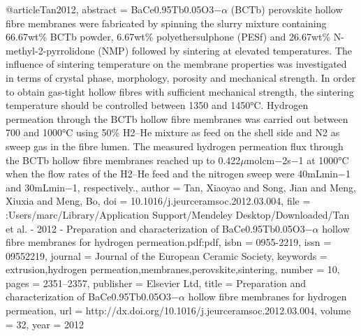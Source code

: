 @article{Tan2012,
abstract = {BaCe0.95Tb0.05O3−$\alpha$ (BCTb) perovskite hollow fibre membranes were fabricated by spinning the slurry mixture containing 66.67wt{\%} BCTb powder, 6.67wt{\%} polyethersulphone (PESf) and 26.67wt{\%} N-methyl-2-pyrrolidone (NMP) followed by sintering at elevated temperatures. The influence of sintering temperature on the membrane properties was investigated in terms of crystal phase, morphology, porosity and mechanical strength. In order to obtain gas-tight hollow fibres with sufficient mechanical strength, the sintering temperature should be controlled between 1350 and 1450°C. Hydrogen permeation through the BCTb hollow fibre membranes was carried out between 700 and 1000°C using 50{\%} H2–He mixture as feed on the shell side and N2 as sweep gas in the fibre lumen. The measured hydrogen permeation flux through the BCTb hollow fibre membranes reached up to 0.422$\mu$molcm−2s−1 at 1000°C when the flow rates of the H2–He feed and the nitrogen sweep were 40mLmin−1 and 30mLmin−1, respectively.},
author = {Tan, Xiaoyao and Song, Jian and Meng, Xiuxia and Meng, Bo},
doi = {10.1016/j.jeurceramsoc.2012.03.004},
file = {:Users/marc/Library/Application Support/Mendeley Desktop/Downloaded/Tan et al. - 2012 - Preparation and characterization of BaCe0.95Tb0.05O3−$\alpha$ hollow fibre membranes for hydrogen permeation.pdf:pdf},
isbn = {0955-2219},
issn = {09552219},
journal = {Journal of the European Ceramic Society},
keywords = {extrusion,hydrogen permeation,membranes,perovskite,sintering},
number = {10},
pages = {2351--2357},
publisher = {Elsevier Ltd},
title = {{Preparation and characterization of BaCe0.95Tb0.05O3−$\alpha$ hollow fibre membranes for hydrogen permeation}},
url = {http://dx.doi.org/10.1016/j.jeurceramsoc.2012.03.004},
volume = {32},
year = {2012}
}
